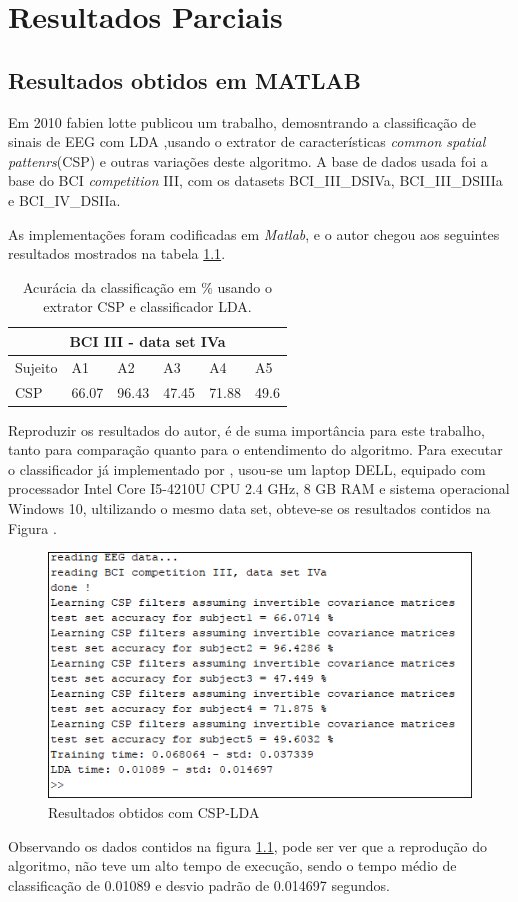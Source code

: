 \chapter[Resultados Parcias ]{Resultados Parciais}

\section{Resultados obtidos em MATLAB}
Em 2010 fabien lotte publicou um trabalho, demosntrando a classificação de sinais de EEG com LDA \cite{F.Lotte},usando o extrator de características \textit{common spatial pattenrs}(CSP) e outras
variações deste algoritmo. A base de dados usada foi a base do BCI \textit{competition} III, com os datasets BCI\_III\_DSIVa, BCI\_III\_DSIIIa e BCI\_IV\_DSIIa. 

As implementações foram codificadas em \textit{Matlab}, e o autor chegou aos seguintes resultados mostrados na tabela \ref{resultlotte}.

\begin{table}[h]
\centering
\caption{Acurácia da classificação em \% usando o extrator CSP e classificador LDA.}
\label{resultlotte}
\begin{tabular}{|l|l|l|l|l|l|}
\hline
\multicolumn{6}{|c|}{BCI III -  data set IVa}  \\ \hline
Sujeito & A1    & A2    & A3    & A4    & A5   \\ \hline
CSP     & 66.07 & 96.43 & 47.45 & 71.88 & 49.6 \\ \hline
\end{tabular}
\end{table}
 
Reproduzir os resultados do autor, é de suma importância para este trabalho, tanto para comparação quanto para o entendimento do algoritmo. Para executar o classificador já implementado por \cite{F.Lotte}, usou-se um laptop DELL, equipado com processador Intel Core I5-4210U CPU 2.4 GHz, 8 GB RAM e sistema operacional Windows 10,  ultilizando o mesmo data set, obteve-se os resultados contidos na Figura . 

\begin{figure}[h]
	\centering
	\includegraphics[keepaspectratio=true,scale=0.75]{figuras/resultados_csp_lda.png}
	\caption{Resultados obtidos  com CSP-LDA}
	\label{resultadoLotte}
\end{figure}

Observando os dados contidos na figura \ref{resultadoLotte}, pode ser ver que a reprodução do algoritmo, não teve um alto tempo de execução, sendo o tempo médio de classificação de 0.01089 e desvio padrão de 0.014697 segundos. 